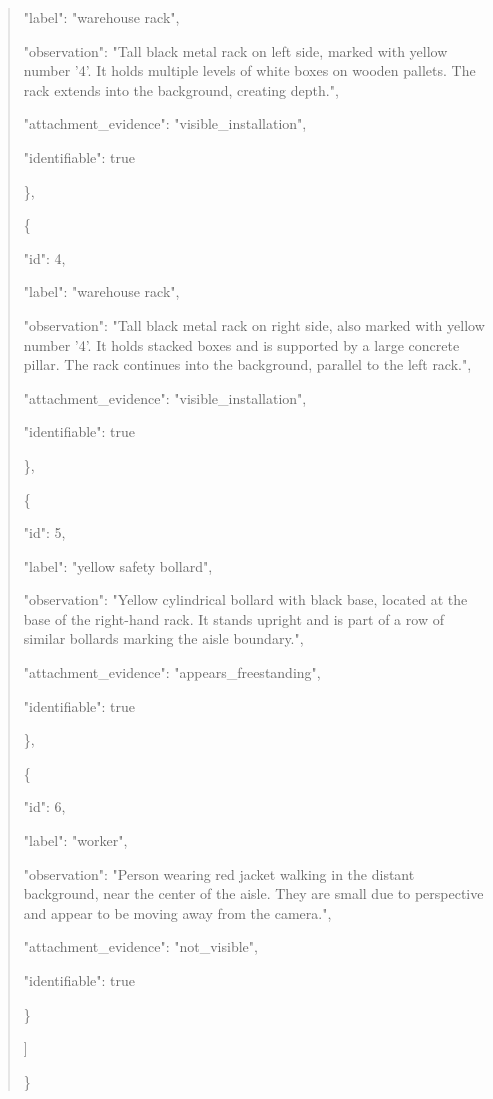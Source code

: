 \documentclass[10pt,a4paper]{article}
\begin{document}
\begin{quote}
      "label":\allowbreak{} "warehouse rack",\allowbreak{}\par
      "observation":\allowbreak{} "Tall black metal rack on left side,\allowbreak{} marked with yellow number '4'. It holds multiple levels of white boxes on wooden pallets. The rack extends into the background,\allowbreak{} creating depth.",\allowbreak{}\par
      "attachment\_evidence":\allowbreak{} "visible\_installation",\allowbreak{}\par
      "identifiable":\allowbreak{} true\par
    \},\allowbreak{}\par
    \{\par
      "id":\allowbreak{} 4,\allowbreak{}\par
      "label":\allowbreak{} "warehouse rack",\allowbreak{}\par
      "observation":\allowbreak{} "Tall black metal rack on right side,\allowbreak{} also marked with yellow number '4'. It holds stacked boxes and is supported by a large concrete pillar. The rack continues into the background,\allowbreak{} parallel to the left rack.",\allowbreak{}\par
      "attachment\_evidence":\allowbreak{} "visible\_installation",\allowbreak{}\par
      "identifiable":\allowbreak{} true\par
    \},\allowbreak{}\par
    \{\par
      "id":\allowbreak{} 5,\allowbreak{}\par
      "label":\allowbreak{} "yellow safety bollard",\allowbreak{}\par
      "observation":\allowbreak{} "Yellow cylindrical bollard with black base,\allowbreak{} located at the base of the right-hand rack. It stands upright and is part of a row of similar bollards marking the aisle boundary.",\allowbreak{}\par
      "attachment\_evidence":\allowbreak{} "appears\_freestanding",\allowbreak{}\par
      "identifiable":\allowbreak{} true\par
    \},\allowbreak{}\par
    \{\par
      "id":\allowbreak{} 6,\allowbreak{}\par
      "label":\allowbreak{} "worker",\allowbreak{}\par
      "observation":\allowbreak{} "Person wearing red jacket walking in the distant background,\allowbreak{} near the center of the aisle. They are small due to perspective and appear to be moving away from the camera.",\allowbreak{}\par
      "attachment\_evidence":\allowbreak{} "not\_visible",\allowbreak{}\par
      "identifiable":\allowbreak{} true\par
    \}\par
  ]\par
\}
\end{quote}
\end{document}
